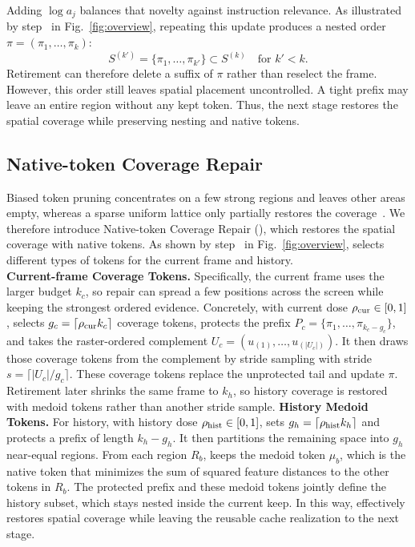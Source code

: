 %
Adding $\log a_j$ balances that novelty against instruction relevance.
%
As illustrated by step~ in Fig.~\ref{fig:overview}, repeating this update produces a nested order $\pi=(\pi_1,\ldots,\pi_k)$:
\begin{equation}
S^{(k')}=\{\pi_1,\ldots,\pi_{k'}\}\subset S^{(k)}\quad\text{for }k'<k.
\label{eq:prefix}
\end{equation}
%
Retirement can therefore delete a suffix of $\pi$ rather than reselect the frame.
%
However, this order still leaves spatial placement uncontrolled.
%
A tight prefix may leave an entire region without any kept token.
%
Thus, the next stage restores the spatial coverage while preserving nesting and native tokens.

\subsection{Native-token Coverage Repair}
\label{sec:method-c}
Biased token pruning concentrates on a few strong regions and leaves other areas empty, whereas a sparse uniform lattice only partially restores the coverage~\citep{xu2026score}.
%
We therefore introduce Native-token Coverage Repair (\awc{}), which restores the spatial coverage with native tokens.
%
As shown by step~ in Fig.~\ref{fig:overview}, \awc{} selects different types of tokens for the current frame and history.
\\
\noindent\textbf{Current-frame Coverage Tokens.}
Specifically, the current frame uses the larger budget $k_c$, so repair can spread a few positions across the screen while keeping the strongest ordered evidence.
%
Concretely, with current dose $\rho_{\mathrm{cur}}\in[0,1]$, \awc{} selects $g_c=\lceil\rho_{\mathrm{cur}} k_c\rceil$ coverage tokens, protects the prefix $P_c=\{\pi_1,\ldots,\pi_{k_c-g_c}\}$, and takes the raster-ordered complement $U_c=(u_{(1)},\ldots,u_{(|U_c|)})$.
%
It then draws those coverage tokens from the complement by stride sampling with stride $s=\lceil|U_c|/g_c\rceil$.
%
These coverage tokens replace the unprotected tail and update $\pi$.
%
Retirement later shrinks the same frame to $k_h$, so history coverage is restored with medoid tokens rather than another stride sample.
%
\noindent\textbf{History Medoid Tokens.}
For history, with history dose $\rho_{\mathrm{hist}}\in[0,1]$, \awc{} sets $g_h=\lceil\rho_{\mathrm{hist}} k_h\rceil$ and protects a prefix of length $k_h-g_h$.
%
It then partitions the remaining space into $g_h$ near-equal regions.
%
From each region $R_b$, \awc{} keeps the medoid token $\mu_b$, which is the native token that minimizes the sum of squared feature distances to the other tokens in $R_b$.
%
The protected prefix and these medoid tokens jointly define the history subset, which stays nested inside the current keep.
%
In this way, \awc{} effectively restores spatial coverage while leaving the reusable cache realization to the next stage.

